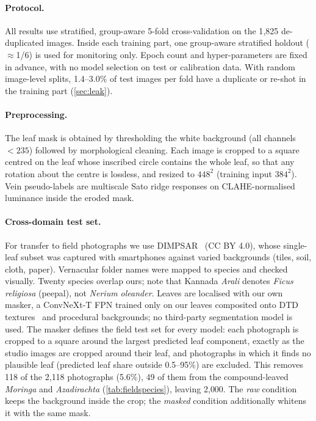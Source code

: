 \paragraph{Protocol.} All results use stratified, group-aware 5-fold cross-validation on the 1{,}825
de-duplicated images. Inside each training part, one group-aware stratified holdout ($\approx$1/6)
is used for monitoring only. Epoch count and
hyper-parameters are fixed in advance, with no model selection on test or calibration data. With
random image-level splits, 1.4--3.0\% of test images per fold have a duplicate or re-shot in the
training part (\cref{sec:leak}).

\paragraph{Preprocessing.} The leaf mask is obtained by thresholding the white background
(all channels $<235$) followed by morphological cleaning. Each image is cropped to a square
centred on the leaf whose inscribed circle contains the whole leaf, so that any rotation about the
centre is lossless, and resized to $448^2$ (training input $384^2$). Vein pseudo-labels are
multiscale Sato ridge responses on CLAHE-normalised luminance inside the eroded mask.

\paragraph{Cross-domain test set.} For transfer to field photographs we use DIMPSAR~\citep{pushpa2023dimpsar}
(CC BY 4.0), whose single-leaf subset was captured with smartphones against varied backgrounds (tiles,
soil, cloth, paper). Vernacular folder names were mapped to species and checked visually. Twenty
species overlap ours; note that Kannada \emph{Arali} denotes \textit{Ficus religiosa} (peepal), not
\textit{Nerium oleander}. Leaves are localised with our own masker, a ConvNeXt-T FPN trained only on
our leaves composited onto DTD textures~\citep{cimpoi2014dtd} and procedural backgrounds; no
third-party segmentation model is used. The masker defines the field test set for every model: each
photograph is cropped to a square around the largest predicted leaf component, exactly as the studio
images are cropped around their leaf, and photographs in which it finds no plausible leaf (predicted
leaf share outside 0.5--95\%) are excluded. This removes 118 of the 2{,}118 photographs (5.6\%), 49 of
them from the compound-leaved \textit{Moringa} and \textit{Azadirachta} (\cref{tab:fieldspecies}),
leaving 2{,}000. The \emph{raw} condition keeps the background inside the crop; the \emph{masked}
condition additionally whitens it with the same mask.
